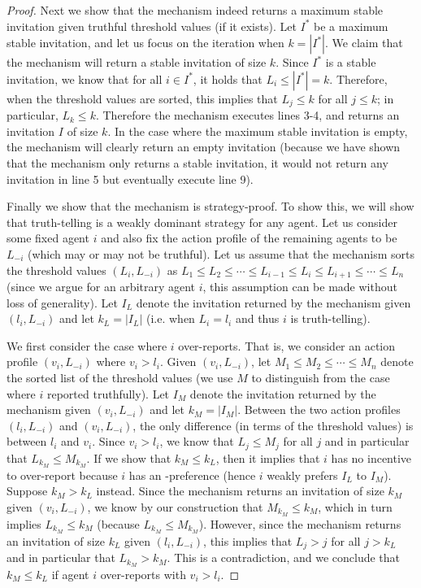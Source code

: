 \begin{proof}
	Next we show that the mechanism indeed returns a maximum stable invitation given truthful threshold values (if it exists). Let $I^*$ be a maximum stable invitation, and let us focus on the iteration when $k = |I^*|$. We claim that the mechanism will return a stable invitation of size $k$.  Since $I^*$ is a stable invitation, we know that for all $i\in I^*$, it holds that $L_i \leq |I^*| = k$. Therefore, when the threshold values are sorted, this implies that $L_j \leq k$ for all $j\leq k$; in particular, $L_k \leq k$. Therefore the mechanism executes lines 3-4, and returns an invitation $I$ of size $k$.  In the case where the maximum stable invitation is empty, the mechanism will clearly return an empty invitation (because we have shown that the mechanism only returns a stable invitation, it would not return any invitation in line 5 but eventually execute line 9). 

	Finally we show that the mechanism is strategy-proof. To show this, we will show that truth-telling is a weakly dominant strategy for any agent. 
	Let us consider some fixed agent $i$ and also fix the action profile of the remaining agents to be $L_{-i}$ (which may or may not be truthful).
	Let us assume that the mechanism sorts the threshold values $(L_i, L_{-i})$ as $L_1 \leq L_2 \leq \cdots \leq L_{i-1} \leq L_i \leq L_{i+1} \leq \cdots \leq L_n$ (since we argue for an arbitrary agent $i$, this assumption can be made without loss of generality).
	Let $I_L$ denote the invitation returned by the mechanism given $(l_i, L_{-i})$ and let $k_L = |I_L|$ (i.e. when $L_i = l_i$ and thus $i$ is truth-telling). 

	We first consider the case where $i$ over-reports.  That is, we consider an action profile $(v_i, L_{-i})$ where $v_i > l_i$. Given $(v_i, L_{-i})$, let $M_1 \leq M_2 \leq \cdots \leq M_{n}$ denote the sorted list of the threshold values (we use $M$ to distinguish from the case where $i$ reported truthfully). Let $I_M$ denote the invitation returned by the mechanism given $(v_i, L_{-i})$ and let $k_M = |I_M|$. Between the two action profiles $(l_i, L_{-i})$ and $(v_i, L_{-i})$, the only difference (in terms of the threshold values) is between $l_i$ and $v_i$. Since $v_i > l_i$, we know that $L_j \leq M_j$ for all $j$ and in particular that $L_{k_M} \leq M_{k_M}$. If we show that $k_M \leq k_L$, then it implies that $i$ has no incentive to over-report because $i$ has an \INC-preference (hence $i$ weakly prefers $I_L$ to $I_M$). Suppose $k_M > k_L$ instead. Since the mechanism returns an invitation of size $k_M$ given $(v_i, L_{-i})$, we know by our construction that $M_{k_M} \leq k_M$, which in turn implies $L_{k_M} \leq k_M$ (because $L_{k_M} \leq M_{k_M}$). However, since the mechanism returns an invitation of size $k_L$ given $(l_i, L_{-i})$, this implies that $L_j > j$ for all $j > k_L$ and in particular that $L_{k_M} > k_M$.  This is a contradiction, and we conclude that $k_M \leq k_L$ if agent $i$ over-reports with $v_i > l_i$. 


\end{proof}
